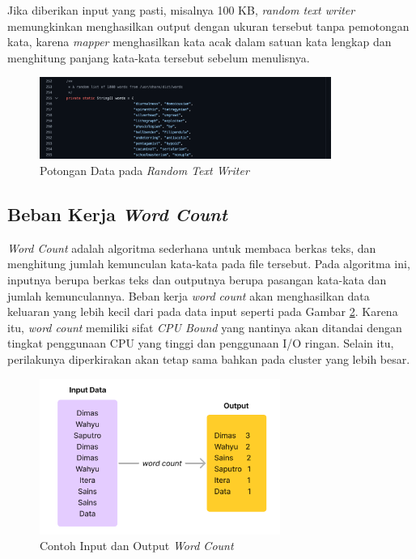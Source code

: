Jika diberikan input yang pasti, misalnya 100 KB, \textit{random text writer} memungkinkan menghasilkan output dengan ukuran tersebut tanpa pemotongan kata, karena \textit{mapper} menghasilkan kata acak dalam satuan kata lengkap dan menghitung panjang kata-kata tersebut sebelum menulisnya.

\begin{figure}[h]
    \centering
    \includegraphics[width=0.85\textwidth]{figures/ch02/contoh-data}
    \caption{Potongan Data pada \textit{Random Text Writer}}
    \label{fig:contoh-data}
\end{figure}


\subsection{Beban Kerja \textit{Word Count}}
\textit{Word Count} adalah algoritma sederhana untuk membaca berkas teks, dan menghitung jumlah kemunculan kata-kata pada file tersebut. Pada algoritma ini, inputnya berupa berkas teks dan outputnya berupa pasangan kata-kata dan jumlah kemunculannya. Beban kerja \textit{word count} akan menghasilkan data keluaran yang lebih kecil dari pada data input seperti pada Gambar \ref{fig:sample-wordcount}.
Karena itu, \textit{word count} memiliki sifat \textit{CPU Bound} yang nantinya akan ditandai dengan tingkat penggunaan CPU yang tinggi dan penggunaan I/O ringan. Selain itu, perilakunya diperkirakan akan tetap sama bahkan pada cluster yang lebih besar.

\begin{figure}[h]
    \centering
    \includegraphics[width=0.7\textwidth]{figures/ch02/sample-wordcount.png}
    \caption{Contoh Input dan Output \textit{Word Count}}
    \label{fig:sample-wordcount}
\end{figure}

